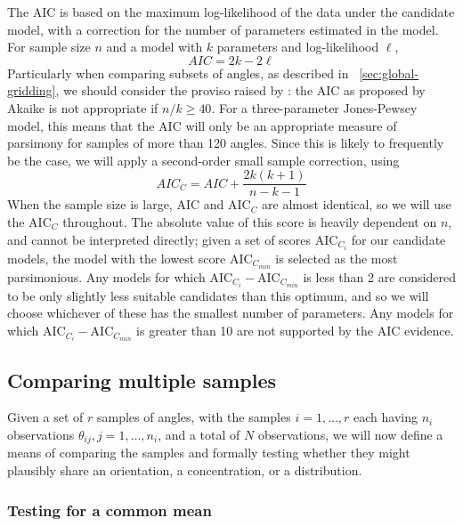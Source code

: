 \documentclass[../../ArchStats.tex]{subfiles}
\begin{document}
The AIC is based on the maximum log-likelihood of the data under the candidate model, with a correction for the number of parameters estimated in the model\cite{Akaike1974}. For sample size $n$ and a model with $k$ parameters and log-likelihood $\ell$, 
\begin{equation}
AIC = 2k - 2 \ell
\end{equation}
Particularly when comparing subsets of angles, as described in ~\ref{sec:global-gridding}, we should consider the proviso raised by \cite{Burnham2004}: the AIC as proposed by Akaike  is not appropriate if $n/k \geq 40$. For a three-parameter Jones-Pewsey model, this means that the AIC will only be an appropriate measure of parsimony for samples of more than 120 angles. Since this is likely to frequently be the case, we will apply a second-order small sample correction, using
\begin{equation}
AIC_C = AIC + \frac{2k(k+1)}{n-k-1}
\end{equation}
When the sample size is large, AIC and AIC$_C$ are almost identical, so we will use the AIC$_C$ throughout. The absolute value of this score is heavily dependent on $n$, and cannot be interpreted directly; given a set of scores AIC$_{C_i}$ for our candidate models, the model with the lowest score AIC$_{C_{min}}$ is selected as the most parsimonious. Any models for which AIC$_{C_i} - $AIC$_{C_{min}}$ is less than 2 are considered to be only slightly less suitable candidates than this optimum, and so we will choose whichever of these has the smallest number of parameters. Any models for which AIC$_{C_i} - $AIC$_{C_{min}}$ is greater than 10 are not supported by the AIC evidence.



\subsection{Comparing multiple samples}
\label{sec:similarity-tests}

Given a set of $r$  samples of angles, with the samples $i = 1, \dots, r$ each having $n_i$ observations $\theta_{ij}, j = 1, \dots, n_i$, and a total of $N$ observations, we will now define a means of comparing the samples and formally testing whether they might plausibly share an orientation, a concentration, or a distribution. 

\subsubsection{Testing for a common mean}
\label{sec:common-mean-test}
\end{document}
